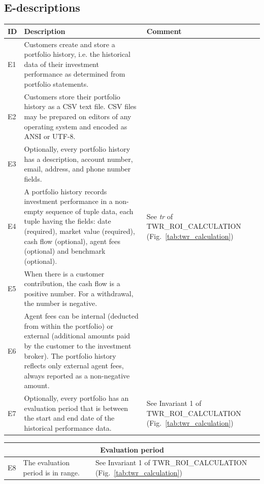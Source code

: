 \documentclass[runningheads,12pt]{article}
\begin{document}
\subsection{E-descriptions}

{\centering
\begin{longtable}{|l|p{9cm}|p{5cm}|}
\hline
\textbf{ID} & \textbf{Description} & \textbf{Comment}\\

\hline
E1 & Customers create and store a portfolio history, i.e. the historical data of their investment performance as determined from portfolio statements. & \\

\hline
E2 & Customers store their portfolio history as a CSV text file. CSV files may be prepared on editors of any operating system and encoded as ANSI or UTF-8. & \\

\hline
E3 & Optionally, every portfolio history has a description, account number, email, address, and phone number fields. & \\

\hline
E4 & A portfolio history records investment performance in a non-empty sequence of tuple data, each tuple having the fields: date (required), market value (required), cash flow (optional), agent fees (optional) and benchmark (optional). & See \textit{tr} of TWR\_ROI\_CALCULATION (Fig.~\ref{tab:twr_calculation})\\

\hline
E5 & When there is a customer contribution, the cash flow is a positive number. For a withdrawal, the number is negative. & \\

\hline
E6 & Agent fees can be internal (deducted from within the portfolio) or external (additional amounts paid by the customer to the investment broker). The portfolio history reflects only external agent fees, always reported as a non-negative amount. & \\

\hline
E7 & Optionally, every portfolio has an evaluation period that is between the start and end date of the historical performance data. & See Invariant 1 of TWR\_ROI\_CALCULATION (Fig.~\ref{tab:twr_calculation})\\

\hline
\end{longtable}
}
\centering
\begin{longtable}{|l|p{9cm}|p{5cm}|}
\hline
\multicolumn{3}{|c|}{\textbf{Evaluation period}} \\

\hline
E8 & The evaluation period is in range. & See Invariant 1 of TWR\_ROI\_CALCULATION (Fig.~\ref{tab:twr_calculation})\\

\hline
\end{longtable}
\end{document}
